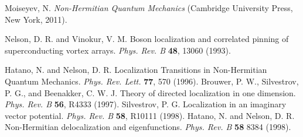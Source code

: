 \documentclass[report,epsfig,pre]{revtex4}
\begin{document}
\begin{thebibliography}{150}

 Moiseyev, N. {\it Non-Hermitian Quantum Mechanics} (Cambridge University Press, New York, 2011).

 Nelson, D. R. and Vinokur, V. M. Boson localization and correlated pinning of superconducting vortex arrays. \textit{Phys. Rev. B} {\bf 48}, 13060 (1993).

 Hatano, N. and Nelson, D. R. Localization Transitions in Non-Hermitian Quantum Mechanics. \textit{Phys. Rev. Lett.} {\bf 77}, 570 (1996).
 Brouwer, P. W., Silvestrov, P. G., and Beenakker, C. W. J. Theory of directed localization in one dimension. \textit{Phys. Rev. B} {\bf 56}, R4333 (1997).
 Silvestrov, P. G. Localization in an imaginary vector potential. \textit{Phys. Rev. B} {\bf 58}, R10111 (1998).
 Hatano, N. and Nelson, D. R. Non-Hermitian delocalization and eigenfunctions. \textit{Phys. Rev. B} {\bf 58} 8384 (1998).


\end{thebibliography}
\end{document}
